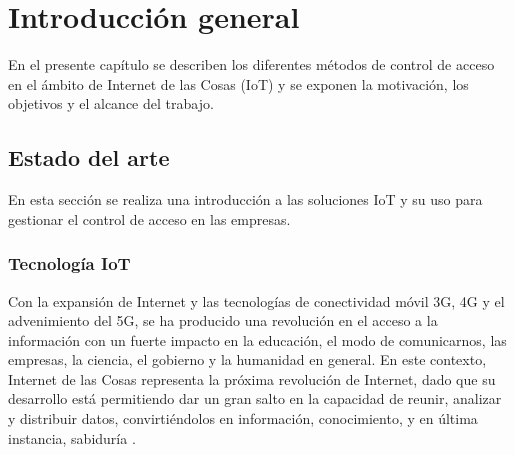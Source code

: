 
\chapter{Introducción general} %

\label{Chapter1} %
\label{IntroGeneral}

En el presente capítulo se describen los diferentes métodos de control de acceso en el ámbito de Internet de las Cosas (IoT) y se exponen la motivación, los objetivos y el alcance del trabajo.


\newcommand{\keyword}[1]{\textbf{#1}}
\newcommand{\tabhead}[1]{\textbf{#1}}
\newcommand{\code}[1]{\texttt{#1}}
\newcommand{\file}[1]{\texttt{\bfseries#1}}
\newcommand{\option}[1]{\texttt{\itshape#1}}
\newcommand{\grados}{$^{\circ}$}



\section{Estado del arte}

En esta sección se realiza una introducción a las soluciones IoT y su uso para gestionar el control de acceso en las empresas.

\subsection{Tecnología IoT}

Con la expansión de Internet y las tecnologías de conectividad móvil 3G, 4G y el advenimiento del 5G, se ha producido una revolución en el acceso a la información con un fuerte impacto en la educación, el modo de comunicarnos, las empresas, la ciencia, el gobierno y la humanidad en general. En este contexto, Internet de las Cosas representa la próxima revolución de Internet, dado que su desarrollo está permitiendo dar un gran salto en la capacidad de
reunir, analizar y distribuir datos, convirtiéndolos en información, conocimiento, y en última instancia, sabiduría \citep{WEBSITE:IOT}.


